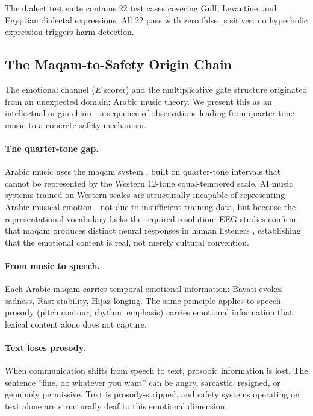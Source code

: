 \documentclass[11pt,a4paper]{article}
\begin{document}
The dialect test suite contains 22 test cases covering Gulf, Levantine, and Egyptian dialectal expressions. All 22 pass with zero false positives: no hyperbolic expression triggers harm detection.


\subsection{The Maqam-to-Safety Origin Chain}
\label{sec:maqam}

The emotional channel ($E$ scorer) and the multiplicative gate structure originated from an unexpected domain: Arabic music theory. We present this as an intellectual origin chain---a sequence of observations leading from quarter-tone music to a concrete safety mechanism.

\paragraph{The quarter-tone gap.} Arabic music uses the maqam system \citep{touma1971,abushumays2013}, built on quarter-tone intervals that cannot be represented by the Western 12-tone equal-tempered scale. AI music systems trained on Western scales are structurally incapable of representing Arabic musical emotion---not due to insufficient training data, but because the representational vocabulary lacks the required resolution. EEG studies confirm that maqam produces distinct neural responses in human listeners \citep{yaghmour2021}, establishing that the emotional content is real, not merely cultural convention.

\paragraph{From music to speech.} Each Arabic maqam carries temporal-emotional information: Bayati evokes sadness, Rast stability, Hijaz longing. The same principle applies to speech: prosody (pitch contour, rhythm, emphasis) carries emotional information that lexical content alone does not capture.

\paragraph{Text loses prosody.} When communication shifts from speech to text, prosodic information is lost. The sentence ``fine, do whatever you want'' can be angry, sarcastic, resigned, or genuinely permissive. Text is prosody-stripped, and safety systems operating on text alone are structurally deaf to this emotional dimension.
\end{document}
